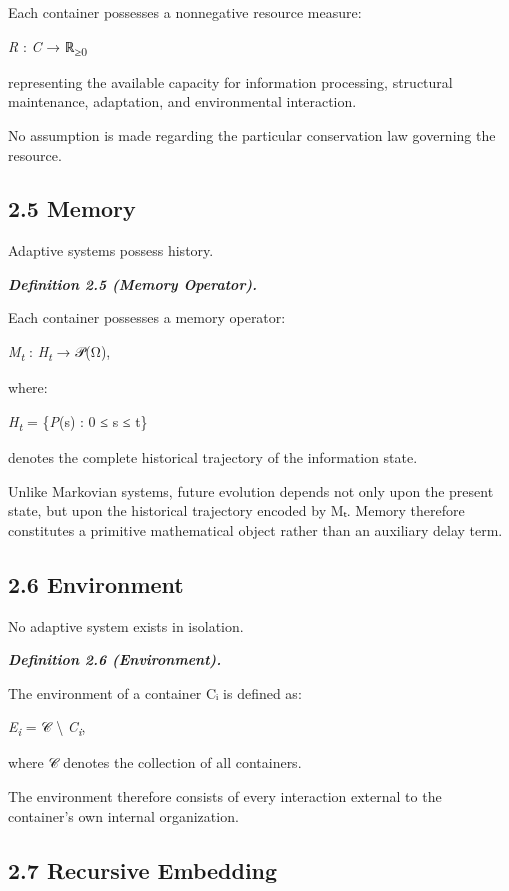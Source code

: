 \documentclass[
]{article}
\begin{document}
Each container possesses a nonnegative resource measure:

\emph{R} : \emph{C} → ℝ\textsubscript{≥0}

representing the available capacity for information processing,
structural maintenance, adaptation, and environmental interaction.

No assumption is made regarding the particular conservation law
governing the resource.

\hypertarget{memory}{%
\subsection{2.5 Memory}\label{memory}}

Adaptive systems possess history.

\emph{\textbf{Definition 2.5 (Memory Operator).}}

Each container possesses a memory operator:

\emph{M\textsubscript{t}} : \emph{H\textsubscript{t}} → 𝒫(Ω),

where:

\emph{H\textsubscript{t}} = \{\emph{P}(s) : 0 ≤ s ≤ t\}

denotes the complete historical trajectory of the information state.

Unlike Markovian systems, future evolution depends not only upon the
present state, but upon the historical trajectory encoded by Mₜ. Memory
therefore constitutes a primitive mathematical object rather than an
auxiliary delay term.

\hypertarget{environment}{%
\subsection{2.6 Environment}\label{environment}}

No adaptive system exists in isolation.

\emph{\textbf{Definition 2.6 (Environment).}}

The environment of a container Cᵢ is defined as:

\emph{E\textsubscript{i}} = 𝒞 \textbackslash{}
\emph{C\textsubscript{i}},

where 𝒞 denotes the collection of all containers.

The environment therefore consists of every interaction external to the
container's own internal organization.

\hypertarget{recursive-embedding}{%
\subsection{2.7 Recursive Embedding}\label{recursive-embedding}}
\end{document}
